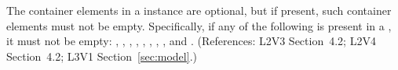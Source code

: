 The  container elements in a \Model instance are optional,
but if present, such container elements must not be empty.  Specifically,
if any of the following is present in a \Model, it must not be empty:
, ,
, ,
, ,
, , 
and .  (References: L2V3 Section~4.2; L2V4 Section~4.2;
L3V1 Section~\ref{sec:model}.)
